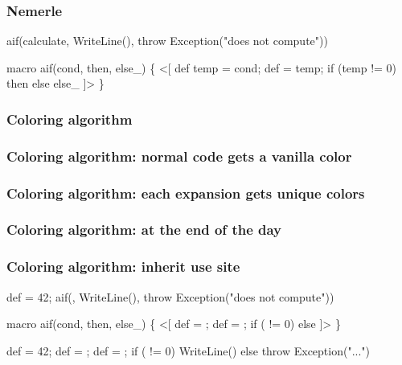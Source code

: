 \documentclass[hyperref={bookmarks=false}]{beamer}
\begin{document}
\begin{frame}[fragile]
\frametitle{Nemerle}
\begin{semiverbatim}
aif(calculate,
  WriteLine(),
  throw Exception("does not compute"))

macro aif(cond, then, else_) \{
  <[
    def temp = {\textdollar}cond;
    def  = temp;
    if (temp != 0) {\textdollar}then else {\textdollar}else_
  ]>
\}


\end{semiverbatim}
\end{frame}

\begin{frame}[fragile]
\frametitle<1>{Coloring algorithm}
\frametitle<2>{Coloring algorithm: normal code gets a vanilla color}
\frametitle<3>{Coloring algorithm: each expansion gets unique colors}
\frametitle<4>{Coloring algorithm: at the end of the day}
\frametitle<5>{Coloring algorithm: inherit use site}
\begin{semiverbatim}
def  = 42;                 
aif(,
  WriteLine(),
  throw Exception("does not compute"))

macro aif(cond, then, else_) \{      
  <[
    def  = ;
    def  = ;
    if ( != 0)  else 
  ]>
\}

def  = 42;                 
def  = ;
def  = ;
if ( != 0) WriteLine() else throw Exception("...")
\end{semiverbatim}
\end{frame}
\end{document}
